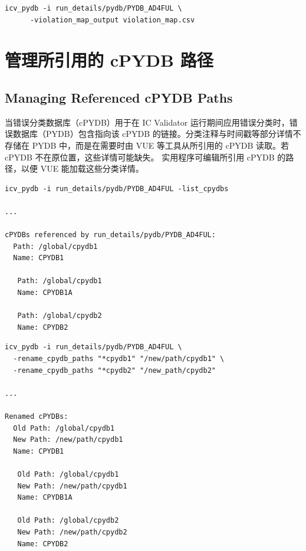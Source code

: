 \begin{lstlisting}[style=shell,caption={从 PYDB 创建含任意分配层与 datatype 号的违例映射文件},label={ex:create-viol-map}]
icv_pydb -i run_details/pydb/PYDB_AD4FUL \
      -violation_map_output violation_map.csv
\end{lstlisting}

\section{管理所引用的 cPYDB 路径}
\subsection*{Managing Referenced cPYDB Paths}

当错误分类数据库（cPYDB）用于在 IC Validator 运行期间应用错误分类时，错误数据库（PYDB）包含指向该 cPYDB 的链接。分类注释与时间戳等部分详情不存储在 PYDB 中，而是在需要时由 VUE 等工具从所引用的 cPYDB 读取。若 cPYDB 不在原位置，这些详情可能缺失。 实用程序可编辑所引用 cPYDB 的路径，以便 VUE 能加载这些分类详情。

\begin{lstlisting}[style=shell,caption={列出 PYDB 所引用的 cPYDB},label={ex:list-cpydbs}]
icv_pydb -i run_details/pydb/PYDB_AD4FUL -list_cpydbs

...

cPYDBs referenced by run_details/pydb/PYDB_AD4FUL:
  Path: /global/cpydb1
  Name: CPYDB1

   Path: /global/cpydb1
   Name: CPYDB1A

   Path: /global/cpydb2
   Name: CPYDB2
\end{lstlisting}

\begin{lstlisting}[style=shell,caption={使用 -rename\_cpydb\_paths 更新 cPYDB 路径},label={ex:rename-cpydb-paths}]
icv_pydb -i run_details/pydb/PYDB_AD4FUL \
  -rename_cpydb_paths "*cpydb1" "/new/path/cpydb1" \
  -rename_cpydb_paths "*cpydb2" "/new_path/cpydb2"

...

Renamed cPYDBs:
  Old Path: /global/cpydb1
  New Path: /new/path/cpydb1
  Name: CPYDB1

   Old Path: /global/cpydb1
   New Path: /new/path/cpydb1
   Name: CPYDB1A

   Old Path: /global/cpydb2
   New Path: /new/path/cpydb2
   Name: CPYDB2
\end{lstlisting}
